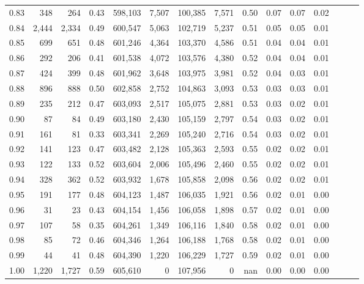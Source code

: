 \begin{tabular}{rrrrrrrrrrrrrrr}
0.83 &     348 &    264 &  0.43 &  598,103 &    7,507 &  100,385 &    7,571 &  0.50 &  0.07 &  0.07 &      0.02 \\
0.84 &   2,444 &  2,334 &  0.49 &  600,547 &    5,063 &  102,719 &    5,237 &  0.51 &  0.05 &  0.05 &      0.01 \\
0.85 &     699 &    651 &  0.48 &  601,246 &    4,364 &  103,370 &    4,586 &  0.51 &  0.04 &  0.04 &      0.01 \\
0.86 &     292 &    206 &  0.41 &  601,538 &    4,072 &  103,576 &    4,380 &  0.52 &  0.04 &  0.04 &      0.01 \\
0.87 &     424 &    399 &  0.48 &  601,962 &    3,648 &  103,975 &    3,981 &  0.52 &  0.04 &  0.03 &      0.01 \\
0.88 &     896 &    888 &  0.50 &  602,858 &    2,752 &  104,863 &    3,093 &  0.53 &  0.03 &  0.03 &      0.01 \\
0.89 &     235 &    212 &  0.47 &  603,093 &    2,517 &  105,075 &    2,881 &  0.53 &  0.03 &  0.02 &      0.01 \\
0.90 &      87 &     84 &  0.49 &  603,180 &    2,430 &  105,159 &    2,797 &  0.54 &  0.03 &  0.02 &      0.01 \\
0.91 &     161 &     81 &  0.33 &  603,341 &    2,269 &  105,240 &    2,716 &  0.54 &  0.03 &  0.02 &      0.01 \\
0.92 &     141 &    123 &  0.47 &  603,482 &    2,128 &  105,363 &    2,593 &  0.55 &  0.02 &  0.02 &      0.01 \\
0.93 &     122 &    133 &  0.52 &  603,604 &    2,006 &  105,496 &    2,460 &  0.55 &  0.02 &  0.02 &      0.01 \\
0.94 &     328 &    362 &  0.52 &  603,932 &    1,678 &  105,858 &    2,098 &  0.56 &  0.02 &  0.02 &      0.01 \\
0.95 &     191 &    177 &  0.48 &  604,123 &    1,487 &  106,035 &    1,921 &  0.56 &  0.02 &  0.01 &      0.00 \\
0.96 &      31 &     23 &  0.43 &  604,154 &    1,456 &  106,058 &    1,898 &  0.57 &  0.02 &  0.01 &      0.00 \\
0.97 &     107 &     58 &  0.35 &  604,261 &    1,349 &  106,116 &    1,840 &  0.58 &  0.02 &  0.01 &      0.00 \\
0.98 &      85 &     72 &  0.46 &  604,346 &    1,264 &  106,188 &    1,768 &  0.58 &  0.02 &  0.01 &      0.00 \\
0.99 &      44 &     41 &  0.48 &  604,390 &    1,220 &  106,229 &    1,727 &  0.59 &  0.02 &  0.01 &      0.00 \\
1.00 &   1,220 &  1,727 &  0.59 &  605,610 &        0 &  107,956 &        0 &   nan &  0.00 &  0.00 &      0.00 \\
\bottomrule
\end{tabular}
